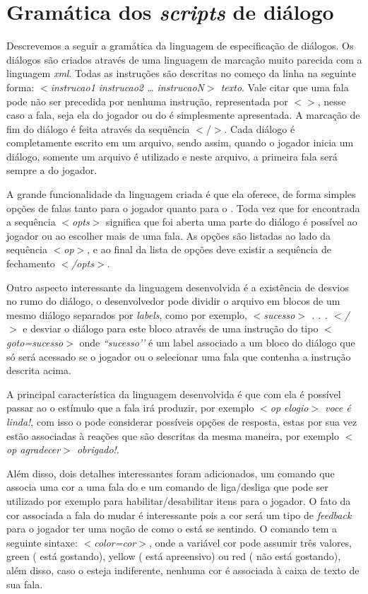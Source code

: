 \chapter{Gramática dos \emph{scripts} de
  diálogo}\label{ap:gram-script-dialogo}

Descrevemos a seguir a gramática da linguagem de especificação de diálogos.
Os diálogos são criados através de uma linguagem de marcação muito parecida com a linguagem \emph{xml}. Todas as instruções são descritas no começo da linha na seguinte forma: \emph{$<$instrucao1 instrucao2 … instrucaoN$>$ texto}. Vale citar que uma fala pode não ser precedida por nenhuma instrução, representada por \emph{$<>$}, nesse caso a fala, seja ela do jogador ou do \npc{} é simplesmente apresentada. A marcação de fim do diálogo é feita através da sequência $<$/$>$.
Cada diálogo é completamente escrito em um arquivo, sendo assim, quando o jogador inicia um diálogo, somente um arquivo é utilizado e neste arquivo, a primeira fala será sempre a do jogador.

A grande funcionalidade da linguagem criada é que ela oferece, de forma simples opções de falas tanto para o jogador quanto para o \npc{}. Toda vez que for encontrada a sequência \emph{$<$opts$>$} significa que foi aberta uma parte do diálogo é possível ao jogador ou ao \npc{} escolher mais de uma fala. As opções são listadas ao lado da sequência \emph{$<$op$>$}, e ao final da lista de opções deve existir a sequência de fechamento \emph{$<$/opts$>$}.

Outro aspecto interessante da linguagem desenvolvida é a existência de desvios no rumo do diálogo, o desenvolvedor pode dividir o arquivo em blocos de um mesmo diálogo separados por \emph{labels}, como por exemplo, \emph{$<$sucesso$>$ . . . $<$/$>$} e desviar o diálogo para este bloco através de uma instrução do tipo \emph{$<$goto=sucesso$>$} onde \emph{``sucesso’’} é um label associado a um bloco do diálogo que só será acessado se o jogador ou o \npc{} selecionar uma fala que contenha a instrução descrita acima.

A principal característica da linguagem desenvolvida é que com ela é possível passar ao \npc{} o estímulo que a fala irá produzir, por exemplo \emph{$<$op elogio$>$ voce é linda!}, com isso o \npc pode considerar possíveis opções de resposta, estas por sua vez estão associadas à reações que são descritas da mesma maneira, por exemplo \emph{$<$op agradecer$>$ obrigado!}. 

Além disso, dois detalhes interessantes foram adicionados, um comando que associa uma cor a uma fala do \npc{} e um comando de liga/desliga que pode ser utilizado por exemplo para habilitar/desabilitar itens para o jogador. O fato da cor associada a fala do \npc{} mudar é interessante pois a cor será um tipo de \emph{feedback} para o jogador ter uma noção de como o \npc{} está se sentindo. O comando tem a seguinte sintaxe: \emph{$<$color=cor$>$}, onde a variável cor pode assumir três valores, green (\npc{} está gostando), yellow (\npc{} está apreensivo) ou red (\npc{} não está gostando), além disso, caso o \npc{} esteja indiferente, nenhuma cor é associada à caixa de texto de sua fala. 


